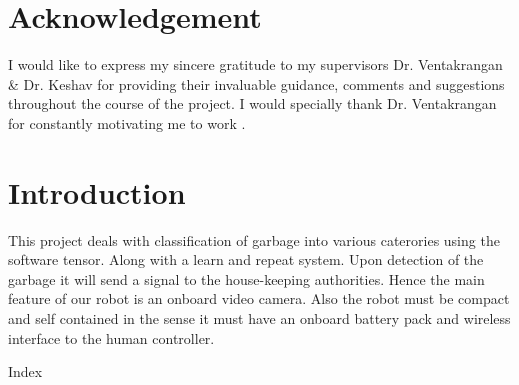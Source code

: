 \documentclass[a4paper,12pt]{article}
\begin{document}
\section{Acknowledgement}
{
I would like to express my sincere gratitude to my supervisors Dr. Ventakrangan & Dr. Keshav for providing their invaluable guidance, comments and suggestions throughout the course of the project. I would specially thank Dr. Ventakrangan for constantly motivating me to work . 
}
\newpage
\tableofcontents

\section{Introduction}
This project deals with classification of garbage into various caterories using the software tensor.
Along with a learn and repeat system. Upon detection of the garbage it will send a signal to the house-keeping authorities. Hence the main feature of our robot is an onboard video camera. Also the robot must be compact and self contained in the sense it must have an onboard battery pack and wireless interface to the human controller.

Index
\subsection{}
\end{document}
